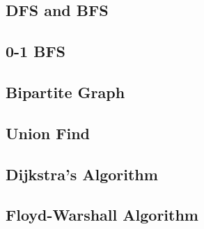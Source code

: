 \documentclass[10pt, a4paper]{article}
\begin{document}
\subsection{DFS and BFS}


\subsection{0-1 BFS}


\subsection{Bipartite Graph}


\subsection{Union Find}


\subsection{Dijkstra's Algorithm}


\subsection{Floyd-Warshall Algorithm}

\end{document}
